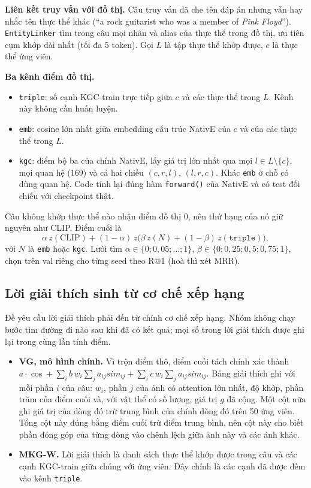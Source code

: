 \textbf{Liên kết truy vấn với đồ thị.} Câu truy vấn đã che tên đáp án nhưng vẫn hay nhắc tên thực thể khác (``a rock
guitarist who was a member of \emph{Pink Floyd}''). \texttt{EntityLinker} tìm trong câu mọi nhãn và alias của thực thể
trong đồ thị, ưu tiên cụm khớp dài nhất (tối đa 5 token). Gọi $L$ là tập thực thể khớp được, $c$ là thực thể ứng viên.

\textbf{Ba kênh điểm đồ thị.}
\begin{itemize}
\item \texttt{triple}: số cạnh KGC-train trực tiếp giữa $c$ và các thực thể trong $L$. Kênh này không cần huấn luyện.
\item \texttt{emb}: cosine lớn nhất giữa embedding cấu trúc NativE của $c$ và của các thực thể trong $L$.
\item \texttt{kgc}: điểm bộ ba của chính NativE, lấy giá trị lớn nhất qua mọi $l \in L\setminus\{c\}$, mọi quan hệ (169)
và cả hai chiều $(c, r, l)$, $(l, r, c)$. Khác \texttt{emb} ở chỗ có dùng quan hệ. Code tính lại đúng hàm
\texttt{forward()} của NativE và có test đối chiếu với checkpoint thật.
\end{itemize}
Câu không khớp thực thể nào nhận điểm đồ thị 0, nên thứ hạng của nó giữ nguyên như CLIP. Điểm cuối là
\begin{equation}
\alpha\,z(\text{CLIP}) + (1-\alpha)\,z\big(\beta\,z(N) + (1-\beta)\,z(\texttt{triple})\big),
\end{equation}
với $N$ là \texttt{emb} hoặc \texttt{kgc}. Lưới tìm $\alpha \in \{0; 0{,}05; \dots; 1\}$,
$\beta \in \{0; 0{,}25; 0{,}5; 0{,}75; 1\}$, chọn trên val riêng cho từng seed theo R@1 (hoà thì xét MRR).

\subsection{Lời giải thích sinh từ cơ chế xếp hạng}
\label{sec:method-expl}

Đề yêu cầu lời giải thích phải đến từ chính cơ chế xếp hạng. Nhóm không chạy bước tìm đường đi nào sau khi đã có kết quả;
mọi số trong lời giải thích được ghi lại trong cùng lần tính điểm.
\begin{itemize}
\item \textbf{VG, mô hình chính.} Vì trộn điểm thô, điểm cuối tách chính xác thành
$a\cdot\cos + \sum_i b\,w_i \sum_j a_{ij}\mathit{sim}_{ij} + \sum_i c\,w_i \sum_j a_{ij}\mathit{sim}_{ij}$. Bảng giải thích
ghi với mỗi phần $i$ của câu: $w_i$, phần $j$ của ảnh có attention lớn nhất, độ khớp, phần trăm của điểm cuối và, với vật
thể có số lượng, giá trị $g$ đã cộng. Một cột nữa ghi giá trị của dòng đó trừ trung bình của chính dòng đó trên 50 ứng
viên. Tổng cột này đúng bằng điểm cuối trừ điểm trung bình, nên cột này cho biết phần đóng góp của từng dòng vào chênh lệch giữa ảnh này và các ảnh
khác.
\item \textbf{MKG-W.} Lời giải thích là danh sách thực thể khớp được trong câu và các cạnh KGC-train giữa chúng với ứng viên.
Đây chính là các cạnh đã được đếm vào kênh \texttt{triple}.
\end{itemize}
